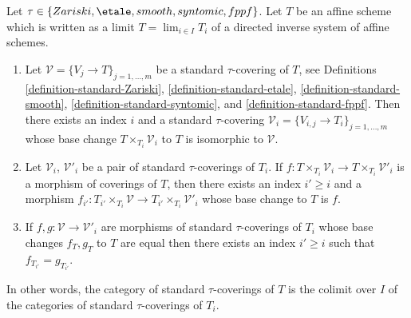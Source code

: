 \begin{lemma}
\label{lemma-limit-fppf-topology}
Let $\tau \in \{Zariski, \etale, smooth, syntomic, fppf\}$.
Let $T$ be an affine scheme which is written as a limit
$T = \lim_{i \in I} T_i$ of a directed inverse system of affine schemes.
\begin{enumerate}
\item Let $\mathcal{V} = \{V_j \to T\}_{j = 1, \ldots, m}$ be a
standard $\tau$-covering of $T$, see Definitions
\ref{definition-standard-Zariski},
\ref{definition-standard-etale},
\ref{definition-standard-smooth},
\ref{definition-standard-syntomic}, and
\ref{definition-standard-fppf}.
Then there exists an index $i$ and a standard $\tau$-covering
$\mathcal{V}_i = \{V_{i, j} \to T_i\}_{j = 1, \ldots, m}$
whose base change $T \times_{T_i} \mathcal{V}_i$ to $T$
is isomorphic to $\mathcal{V}$.
\item Let $\mathcal{V}_i$, $\mathcal{V}'_i$ be a pair of standard
$\tau$-coverings of $T_i$. If
$f : T \times_{T_i} \mathcal{V}_i \to T \times_{T_i} \mathcal{V}'_i$ is
a morphism of coverings of $T$, then there exists an index
$i' \geq i$ and a morphism
$f_{i'} : T_{i'} \times_{T_i} \mathcal{V} \to
T_{i'} \times_{T_i} \mathcal{V}'_i$
whose base change to $T$ is $f$.
\item If
$f, g : \mathcal{V} \to \mathcal{V}'_i$
are morphisms of standard $\tau$-coverings of $T_i$ whose
base changes $f_T, g_T$ to $T$ are equal then there exists an
index $i' \geq i$ such that $f_{T_{i'}} = g_{T_{i'}}$.
\end{enumerate}
In other words, the category of standard $\tau$-coverings of $T$ is
the colimit over $I$ of the categories of standard $\tau$-coverings of $T_i$.
\end{lemma}

